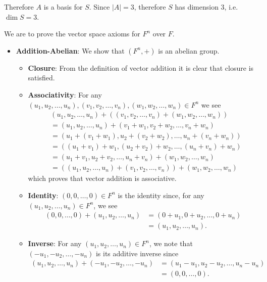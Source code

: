 \begin{questions}
\begin{partquestions}{\alph*}
        Therefore $A$ is a basis for $S$. Since $|A| = 3$, therefore $S$ has dimension 3, i.e. $\dim{S} = 3$.
    \end{partquestions}

    \item We are to prove the vector space axioms for $F^n$ over $F$.
    \begin{itemize}
        \item \textbf{Addition-Abelian}: We show that $(F^n, +)$ is an abelian group.
        \begin{itemize}
            \item \textbf{Closure}: From the definition of vector addition it is clear that closure is satisfied.

            \item \textbf{Associativity}: For any $(u_1, u_2, \dots, u_n), (v_1, v_2, \dots, v_n), (w_1, w_2, \dots, w_n) \in F^n$ we see
            \begin{align*}
                &(u_1, u_2, \dots, u_n) + ((v_1, v_2, \dots, v_n) + (w_1, w_2, \dots, w_n))\\
                &= (u_1, u_2, \dots, u_n) + (v_1 + w_1, v_2 + w_2, \dots, v_n + w_n)\\
                &= (u_1 + (v_1 + w_1), u_2 + (v_2 + w_2), \dots, u_n + (v_n + w_n))\\
                &= ((u_1 + v_1) + w_1, (u_2 + v_2) + w_2, \dots, (u_n + v_n) + w_n)\\
                &= (u_1 + v_1, u_2 + v_2, \dots, u_n + v_n) + (w_1, w_2, \dots, w_n)\\
                &= ((u_1, u_2, \dots, u_n) + (v_1, v_2, \dots, v_n)) + (w_1, w_2, \dots, w_n)
            \end{align*}
            which proves that vector addition is associative.

            \item \textbf{Identity}: $(0, 0, \dots, 0) \in F^n$ is the identity since, for any $(u_1, u_2, \dots, u_n) \in F^n$, we see
            \begin{align*}
                (0, 0, \dots, 0) + (u_1, u_2, \dots, u_n) &= (0 + u_1, 0 + u_2, \dots, 0 + u_n)\\
                &= (u_1, u_2, \dots, u_n).
            \end{align*}

            \item \textbf{Inverse}: For any $(u_1, u_2, \dots, u_n) \in F^n$, we note that $(-u_1, -u_2, \dots, -u_n)$ is its additive inverse since
            \begin{align*}
                (u_1, u_2, \dots, u_n) + (-u_1, -u_2, \dots, -u_n) &= (u_1 - u_1, u_2 - u_2, \dots, u_n - u_n)\\
                &= (0, 0, \dots, 0).
            \end{align*}


\end{itemize}
\end{itemize}
\end{questions}
